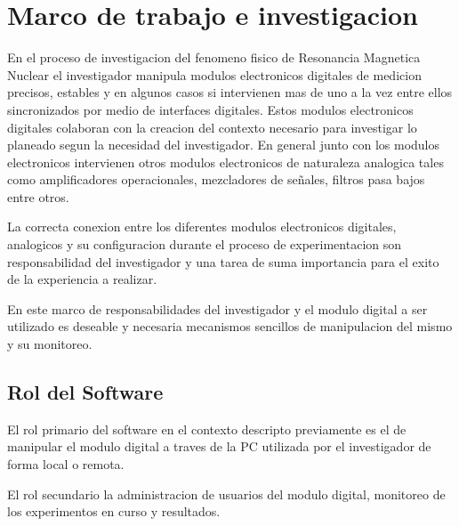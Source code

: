 \section{Marco de trabajo e investigacion}

En el proceso de investigacion del fenomeno fisico de Resonancia Magnetica Nuclear el investigador manipula modulos 
electronicos digitales de medicion precisos, estables y en algunos casos si intervienen mas de uno a la vez entre ellos sincronizados 
por medio de interfaces digitales. Estos modulos electronicos digitales colaboran con la creacion del contexto necesario para investigar lo planeado 
segun la necesidad del investigador. En general junto con los modulos electronicos intervienen otros modulos electronicos de naturaleza analogica
tales como amplificadores operacionales, mezcladores de señales, filtros pasa bajos entre otros.

La correcta conexion entre los diferentes modulos electronicos digitales, analogicos y su configuracion durante el proceso de experimentacion
son responsabilidad del investigador y una tarea de suma importancia para el exito de la experiencia a realizar.

En este marco de responsabilidades del investigador y el modulo digital a ser utilizado es deseable y necesaria mecanismos sencillos de manipulacion
del mismo y su monitoreo.

\subsection{Rol del Software}

El rol primario del software en el contexto descripto previamente es el de manipular el modulo digital a traves de la PC utilizada por el investigador 
de forma local o remota.

El rol secundario la administracion de usuarios del modulo digital, monitoreo de los experimentos en curso y resultados.

\newpage

